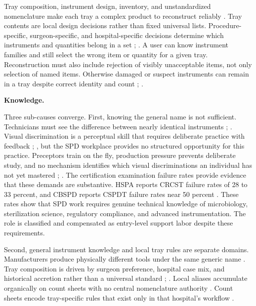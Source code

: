 \documentclass[10pt,a4paper]{article}
\begin{document}
Tray composition, instrument design, inventory, and unstandardized nomenclature
make each tray a complex product to reconstruct reliably
\cite{alfred-et-al-2021}. Tray contents are local design decisions rather than
fixed universal lists. Procedure-specific, surgeon-specific, and
hospital-specific decisions determine which instruments and quantities belong in
a set \cite{dos-santos-et-al-2021};
\cite{ahmadi-et-al-2023}. A user can know
instrument families and still select the wrong item or quantity for a given
tray. Reconstruction must also include rejection of visibly unacceptable items,
not only selection of named items. Otherwise damaged or suspect instruments can
remain in a tray despite correct identity and count
\cite{cdc};
\cite{pennsylvania-patient-safety-authority-2006}.

\textbf{Knowledge.}

Three sub-causes converge. First, knowing the general name is not sufficient.
Technicians must see the difference between nearly identical instruments
\cite{castillo-gutierrez-2025};
\cite{nichol-et-al-2024}. Visual discrimination is
a perceptual skill that requires deliberate practice with feedback
\cite{fast-et-al-2019};
\cite{shreckengost-et-al-2022}, but the SPD workplace
provides no structured opportunity for this practice. Preceptors train on the
fly, production pressure prevents deliberate study, and no mechanism identifies
which visual discriminations an individual has not yet mastered
\cite{nichol-et-al-2024};
\cite{alfred-et-al-2021}. The certification examination
failure rates provide evidence that these demands are substantive. HSPA reports
CRCST failure rates of 28 to 33 percent, and CBSPD reports CSPDT failure rates
near 50 percent
\cite{hspa-crcst-accessed-2026}. These rates show that SPD work
requires genuine technical knowledge of microbiology, sterilization science,
regulatory compliance, and advanced instrumentation. The role is classified and
compensated as entry-level support labor despite these requirements.

Second, general instrument knowledge and local tray rules are separate domains.
Manufacturers produce physically different tools under the same generic name
\cite{nadeau-2024}. Tray composition is driven by surgeon preference, hospital
case mix, and historical accretion rather than a universal standard
\cite{dos-santos-et-al-2021};
\cite{ahmadi-et-al-2023}. Local aliases accumulate
organically on count sheets with no central nomenclature authority
\cite{alfred-et-al-2021}. Count sheets encode tray-specific rules that exist
only in that hospital's workflow \cite{nadeau-2024}.
\end{document}
